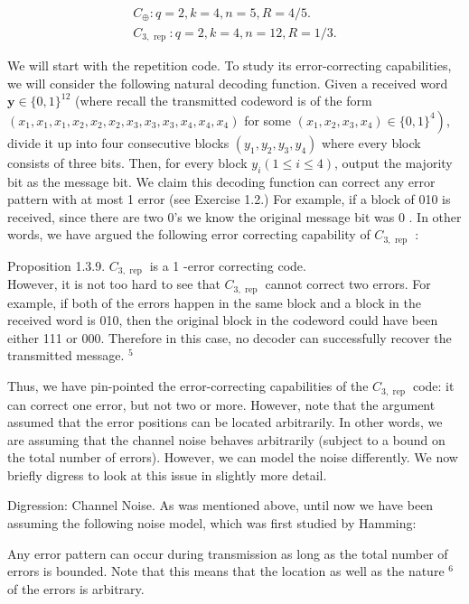 \documentclass[10pt]{article}
\begin{document}
$$
\begin{gathered}
C_{\oplus}: q=2, k=4, n=5, R=4 / 5 . \\
C_{3, \text { rep }}: q=2, k=4, n=12, R=1 / 3 .
\end{gathered}
$$

We will start with the repetition code. To study its error-correcting capabilities, we will consider the following natural decoding function. Given a received word $\mathbf{y} \in\{0,1\}^{12}$ (where recall the transmitted codeword is of the form $\left(x_{1}, x_{1}, x_{1}, x_{2}, x_{2}, x_{2}, x_{3}, x_{3}, x_{3}, x_{4}, x_{4}, x_{4}\right)$ for some $\left.\left(x_{1}, x_{2}, x_{3}, x_{4}\right) \in\{0,1\}^{4}\right)$, divide it up into four consecutive blocks $\left(y_{1}, y_{2}, y_{3}, y_{4}\right)$ where every block consists of three bits. Then, for every block $y_{i}(1 \leq i \leq 4)$, output the majority bit as the message bit. We claim this decoding function can correct any error pattern with at most 1 error (see Exercise 1.2.) For example, if a block of 010 is received, since there are two 0's we know the original message bit was 0 . In other words, we have argued the following error correcting capability of $C_{3, \text { rep }}$ :

Proposition 1.3.9. $C_{3, \text { rep }}$ is a 1 -error correcting code.\\
However, it is not too hard to see that $C_{3, \text { rep }}$ cannot correct two errors. For example, if both of the errors happen in the same block and a block in the received word is 010, then the original block in the codeword could have been either 111 or 000. Therefore in this case, no decoder can successfully recover the transmitted message. ${ }^{5}$

Thus, we have pin-pointed the error-correcting capabilities of the $C_{3, \text { rep }}$ code: it can correct one error, but not two or more. However, note that the argument assumed that the error positions can be located arbitrarily. In other words, we are assuming that the channel noise behaves arbitrarily (subject to a bound on the total number of errors). However, we can model the noise differently. We now briefly digress to look at this issue in slightly more detail.

Digression: Channel Noise. As was mentioned above, until now we have been assuming the following noise model, which was first studied by Hamming:

\begin{displayquote}
Any error pattern can occur during transmission as long as the total number of errors is bounded. Note that this means that the location as well as the nature ${ }^{6}$ of the errors is arbitrary.
\end{displayquote}
\end{document}
